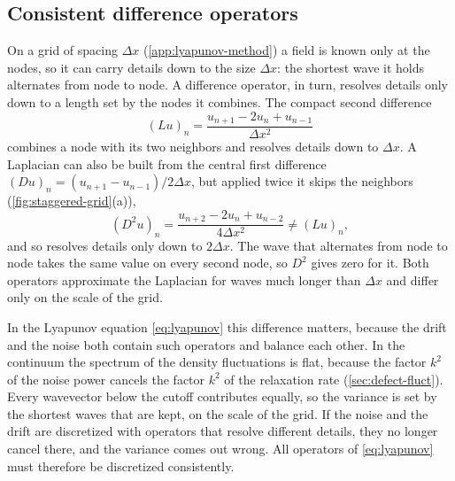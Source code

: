 \documentclass[aps,pre,reprint,superscriptaddress,longbibliography,nofootinbib
]{revtex4-2}
\begin{document}
\subsection{Consistent difference operators}
\label{app:lyapunov-operators}
On a grid of spacing $\Delta x$
(\cref{app:lyapunov-method}) a field is known only at the
nodes, so it can carry details down to the size $\Delta x$:
the shortest wave it holds alternates from node to node. A
difference operator, in turn, resolves details only down to
a length set by the nodes it combines. The compact second
difference
\begin{equation}
  \label{eq:fd-compact}
  (Lu)_n=\frac{u_{n+1}-2u_n+u_{n-1}}{\Delta x^2}
\end{equation}
combines a node with its two neighbors and resolves details
down to $\Delta x$. A Laplacian can also be built from the
central first difference $(Du)_n=(u_{n+1}-u_{n-1})/2\Delta
x$, but applied twice it skips the neighbors
(\cref{fig:staggered-grid}(a)),
\begin{equation}
  \label{eq:fd-central-twice}
  (D^2u)_n=\frac{u_{n+2}-2u_n+u_{n-2}}{4\Delta x^2}\neq(Lu)_n ,
\end{equation}
and so resolves details only down to $2\Delta x$. The wave
that alternates from node to node takes the same value on
every second node, so $D^2$ gives zero for it. Both
operators approximate the Laplacian for waves much longer
than $\Delta x$ and differ only on the scale of the grid.

In the Lyapunov equation \cref{eq:lyapunov} this difference
matters, because the drift and the noise both contain such
operators and balance each other. In the continuum the
spectrum of the density fluctuations is flat, because the
factor $k^2$ of the noise power cancels the factor $k^2$ of
the relaxation rate (\cref{sec:defect-fluct}). Every
wavevector below the cutoff contributes equally, so the
variance is set by the shortest waves that are kept, on the
scale of the grid. If the noise and the drift are
discretized with operators that resolve different details,
they no longer cancel there, and the variance comes out
wrong. All operators of \cref{eq:lyapunov} must therefore
be discretized consistently.
\end{document}
